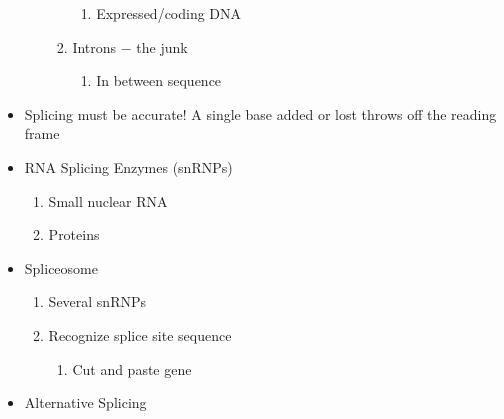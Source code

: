 \documentclass[12pt]{article}
\begin{document}
\begin{itemize}
\begin{enumerate}
\begin{enumerate}
\begin{enumerate}
            \item Expressed/coding DNA

          \end{enumerate}

        \item Introns $-$ the junk

          \begin{enumerate}

            \item In between sequence

          \end{enumerate}

      \end{enumerate}

  \end{enumerate}
  
\item Splicing must be accurate! A single base added or lost throws off the reading frame

\item RNA Splicing Enzymes (snRNPs)

  \begin{enumerate}

    \item Small nuclear RNA

    \item Proteins

  \end{enumerate}

\item Spliceosome

  \begin{enumerate}

    \item Several snRNPs

    \item Recognize splice site sequence

      \begin{enumerate}

        \item Cut and paste gene

      \end{enumerate}

  \end{enumerate}

\item Alternative Splicing

  \begin{enumerate}


\end{enumerate}
\end{itemize}
\end{document}
